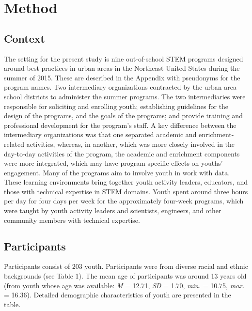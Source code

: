 \documentclass[]{msu-thesis}
\theoremstyle{definition}
\theoremstyle{definition}
\theoremstyle{definition}
\theoremstyle{remark}
\begin{document}
\chapter{Method}\label{method}

\section{Context}\label{context}

The setting for the present study is nine out-of-school STEM programs
designed around best practices in urban areas in the Northeast United
States during the summer of 2015. These are described in the Appendix
with pseudonyms for the program names. Two intermediary organizations
contracted by the urban area school districts to administer the summer
programs. The two intermediaries were responsible for soliciting and
enrolling youth; establishing guidelines for the design of the programs,
and the goals of the programs; and provide training and professional
development for the program's staff. A key difference between the
intermediary organizations was that one separated academic and
enrichment-related activities, whereas, in another, which was more
closely involved in the day-to-day activities of the program, the
academic and enrichment components were more integrated, which may have
program-specific effects on youths' engagement. Many of the programs aim
to involve youth in work with data. These learning environments bring
together youth activity leaders, educators, and those with technical
expertise in STEM domains. Youth spent around three hours per day for
four days per week for the approximately four-week programs, which were
taught by youth activity leaders and scientists, engineers, and other
community members with technical expertise.

\section{Participants}\label{participants}

Participants consist of 203 youth. Participants were from diverse racial
and ethnic backgrounds (see Table 1). The mean age of participants was
around 13 years old (from youth whose age was available: \emph{M} =
12.71, \emph{SD} = 1.70, \emph{min.} = 10.75, \emph{max.} = 16.36).
Detailed demographic characteristics of youth are presented in the
table.
\end{document}
